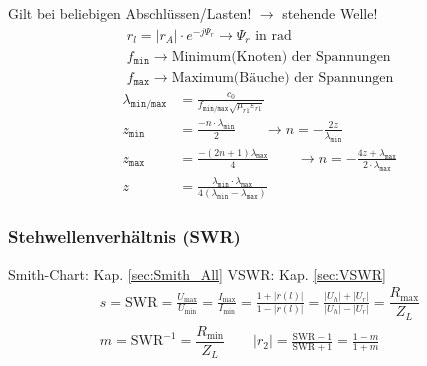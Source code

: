Gilt bei beliebigen Abschlüssen/Lasten! $ \rightarrow $ stehende Welle!
\begin{gather*}
	\boxed{r_{l} = |r_A|\cdot e^{-j\Psi_r}}\rightarrow\Psi_r\text{ in rad}\\
	f_\texttt{min}\rightarrow \text{Minimum(Knoten) der Spannungen}\\
	f_\texttt{max}\rightarrow \text{Maximum(Bäuche) der Spannungen}
\end{gather*}
\begin{align*}
	\lambda_\texttt{min/max} & = \frac{c_0}{f_\texttt{min/max}\sqrt{\mu_{r1}\varepsilon_{r1}}}                                                                                                 \\
	z_\texttt{min}           & =\frac{-n\cdot\lambda_\texttt{min}}{2}                                        \qquad\rightarrow n = -\frac{2z}{\lambda_\texttt{min}}                            \\
	z_\texttt{max}           & =\frac{-(2n+1)\lambda_\texttt{max}}{4}                                        \qquad\rightarrow n = -\frac{4z+\lambda_\texttt{max}}{2\cdot\lambda_\texttt{max}} \\
	z                        & = \frac{\lambda_\texttt{min}\cdot\lambda_\texttt{max}}{4(\lambda_\texttt{min}-\lambda_\texttt{max})}
\end{align*}

\subsubsection{Stehwellenverhältnis (SWR)}
Smith-Chart: Kap. \ref{sec:Smith_All} \qquad VSWR: Kap. \ref{sec:VSWR}
\begin{align*}
	 & s = \mathrm{SWR}       = \frac{U_\text{max}}{U_\text{min}} = \frac{I_\text{max}}{I_\text{min}} = \frac{1+|r(l)|}{1-|r(l)|} = \frac{|U_h|+|U_r|}{|U_h|-|U_r|}= \dfrac{R_{\text{max}}}{Z_L} & \\
	 & m = \mathrm{SWR}^{-1} = \dfrac{R_{\text{min}}}{Z_L} \qquad |r_2| = \frac{\text{SWR}-1}{\text{SWR}+1} = \frac{1-m}{1+m}                                                                    &
\end{align*}

